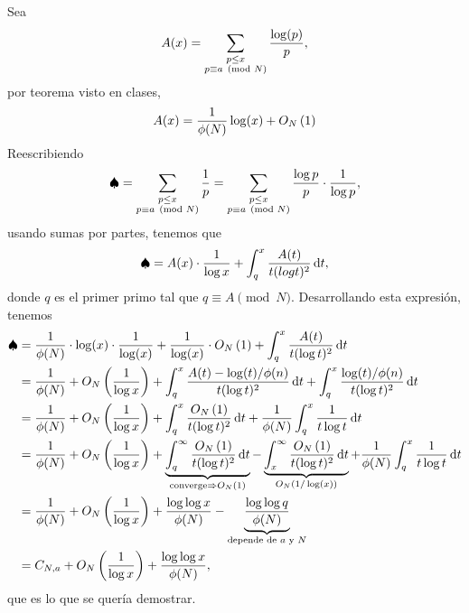 \begin{sol}
	Sea
	$$A(x) = \ds\sum_{\substack{p \leq x \\ p \equiv a \pmod N}} \frac{\log (p)}{p},$$
	por teorema visto en clases,
	$$A(x) = \frac{1}{\phi(N)} \log (x) + \BigO[N]{1}$$
	Reescribiendo
	$$\spadesuit = \ds\sum_{\substack{p \leq x \\ p \equiv a \pmod N}} \frac{1}{p} = \ds\sum_{\substack{p \leq x \\ p \equiv a \pmod N}} \frac{\log p}{p} \cdot \frac{1}{\log p},$$
	usando sumas por partes, tenemos que
	$$\spadesuit = A(x) \cdot \frac{1}{\log x} + \int_q^x \frac{A(t)}{t (log t)^2} \d{t},$$
	donde $q$ es el primer primo tal que $q \equiv A \pmod N$. Desarrollando esta expresión, tenemos
	\begin{align*}
		\spadesuit & = \frac{1}{\phi(N)} \cdot \log (x) \cdot \frac{1}{\log (x)} + \frac{1}{\log (x)} \cdot \BigO[N]{1} + \int_q^x \frac{A(t)}{t (\log t)^2} \d{t}                                                                                                                                                             \\
		           & = \frac{1}{\phi(N)} + \BigO[N]{ \frac{1}{\log x} } + \int_q^x \frac{A(t) - \log(t)/\phi(n)}{t (\log t)^2} \d{t} + \int_q^x \frac{\log(t)/\phi(n)}{t (\log t)^2} \d{t}                                                                                                                                        \\
		           & = \frac{1}{\phi(N)} + \BigO[N]{ \frac{1}{\log x} } + \int_q^x \frac{\BigO[N]{1}}{t (\log t)^2} \d{t} + \frac{1}{\phi(N)} \int_q^x \frac{1}{t \log t} \d{t}                                                                                                                                                   \\
		           & = \frac{1}{\phi(N)} + \BigO[N]{ \frac{1}{\log x} } + \underbrace{\int_q^\infty \frac{\BigO[N]{1}}{t (\log t)^2} \d{t}}_{\text{converge} \Rightarrow \BigO[N]{1}} - \underbrace{\int_x^\infty \frac{\BigO[N]{1}}{t (\log t)^2} \d{t}}_{O_N(1/\log (x))} + \frac{1}{\phi(N)} \int_q^x \frac{1}{t \log t} \d{t} \\
		           & = \frac{1}{\phi(N)} + \BigO[N]{ \frac{1}{\log x} } + \frac{\log \log x}{\phi (N)}  - \underbrace{\frac{\log \log q}{\phi (N)}}_{\text{depende de } a \text{ y } N}                                                                                                                                           \\
		           & = C_{N, a} + \BigO[N]{ \frac{1}{\log x} } + \frac{\log \log x}{\phi(N)},
	\end{align*}
	que es lo que se quería demostrar.
\end{sol}

